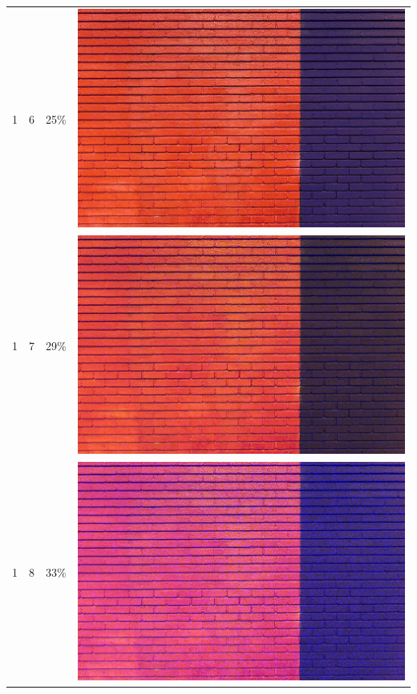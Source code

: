 \documentclass[times, utf8, seminar]{fer}
\begin{document}
\begin{center}
\begin{longtable}{|c|c|c|c|}
1 & 6 &25\% & \includegraphics[scale=0.3]{../benchmark_results/pattern/1_components-6_bits.png} \\
1 & 7 &29\% & \includegraphics[scale=0.3]{../benchmark_results/pattern/1_components-7_bits.png} \\
1 & 8 &33\% & \includegraphics[scale=0.3]{../benchmark_results/pattern/1_components-8_bits.png} \\

\end{longtable}
\end{center}
\end{document}
